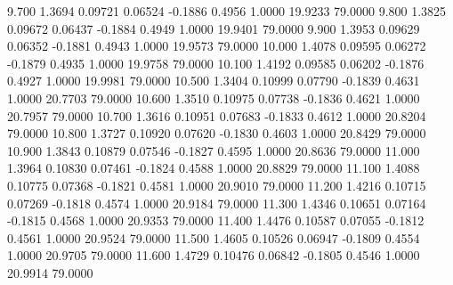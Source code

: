    9.700   1.3694   0.09721   0.06524  -0.1886   0.4956   1.0000  19.9233  79.0000
   9.800   1.3825   0.09672   0.06437  -0.1884   0.4949   1.0000  19.9401  79.0000
   9.900   1.3953   0.09629   0.06352  -0.1881   0.4943   1.0000  19.9573  79.0000
  10.000   1.4078   0.09595   0.06272  -0.1879   0.4935   1.0000  19.9758  79.0000
  10.100   1.4192   0.09585   0.06202  -0.1876   0.4927   1.0000  19.9981  79.0000
  10.500   1.3404   0.10999   0.07790  -0.1839   0.4631   1.0000  20.7703  79.0000
  10.600   1.3510   0.10975   0.07738  -0.1836   0.4621   1.0000  20.7957  79.0000
  10.700   1.3616   0.10951   0.07683  -0.1833   0.4612   1.0000  20.8204  79.0000
  10.800   1.3727   0.10920   0.07620  -0.1830   0.4603   1.0000  20.8429  79.0000
  10.900   1.3843   0.10879   0.07546  -0.1827   0.4595   1.0000  20.8636  79.0000
  11.000   1.3964   0.10830   0.07461  -0.1824   0.4588   1.0000  20.8829  79.0000
  11.100   1.4088   0.10775   0.07368  -0.1821   0.4581   1.0000  20.9010  79.0000
  11.200   1.4216   0.10715   0.07269  -0.1818   0.4574   1.0000  20.9184  79.0000
  11.300   1.4346   0.10651   0.07164  -0.1815   0.4568   1.0000  20.9353  79.0000
  11.400   1.4476   0.10587   0.07055  -0.1812   0.4561   1.0000  20.9524  79.0000
  11.500   1.4605   0.10526   0.06947  -0.1809   0.4554   1.0000  20.9705  79.0000
  11.600   1.4729   0.10476   0.06842  -0.1805   0.4546   1.0000  20.9914  79.0000
